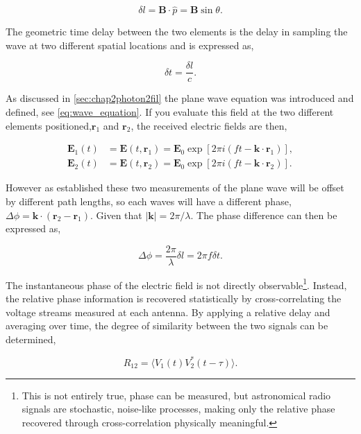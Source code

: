 \begin{equation}
    \delta l = \textbf{B} \cdot \hat p = \textbf{B} \sin \theta.
\end{equation}

The geometric time delay between the two elements is the delay in sampling the wave at two different spatial locations and is expressed as,

\begin{equation}
    \delta t = \frac{\delta l}{c}. 
\end{equation}

As discussed in \cref{sec:chap2photon2fil} the plane wave equation was introduced and defined, see \cref{eq:wave_equation}. If you evaluate this field at the two different elements positioned,$\mathbf{r}_1$ and $\mathbf{r}_2$, the received electric fields are then, 


\begin{align}
\mathbf{E}_1(t) &= \mathbf{E}(t,\mathbf{r}_1)
= \mathbf{E}_0 \exp\!\left[2\pi i\left(ft-\mathbf{k}\cdot\mathbf{r}_1\right)\right], \\
\mathbf{E}_2(t) &= \mathbf{E}(t,\mathbf{r}_2)
= \mathbf{E}_0 \exp\!\left[2\pi i\left(ft-\mathbf{k}\cdot\mathbf{r}_2\right)\right].
\end{align}

However as established these two measurements of the plane wave will be offset by different path lengths, so each waves will have a different phase, $\Delta \phi = \mathbf{k}\cdot(\mathbf{r}_2 - \mathbf{r}_1)$. Given that $|\textbf{k}| = 2 \pi / \lambda$. The phase difference can then be expressed as, 

\begin{equation}
    \Delta \phi = \frac{2 \pi}{\lambda} \delta l = 2 \pi f \delta t. 
\end{equation}

 The instantaneous phase of the electric field is not directly observable\footnote{This is not entirely true, phase can be measured, but astronomical radio signals are stochastic, noise-like processes, making only the relative phase recovered through cross-correlation physically meaningful.}. Instead, the relative phase information is recovered statistically by cross-correlating the voltage streams measured at each antenna. By applying a relative delay and averaging over time, the degree of similarity between the two signals can be determined, 

\begin{equation}
    R_{12} = \langle  V_1 (t) V^*_2 (t - \tau) \rangle. 
\end{equation}

